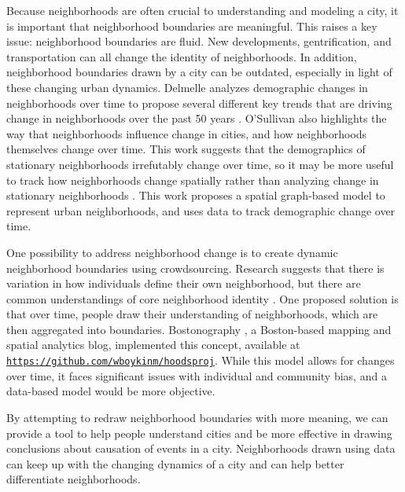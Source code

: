 \documentclass[times new roman,12pt]{article}
\begin{document}
Because neighborhoods are often crucial to understanding and modeling a city, it is important that neighborhood boundaries are meaningful. This raises a key issue: neighborhood boundaries are fluid. New developments, gentrification, and transportation can all change the identity of neighborhoods. In addition, neighborhood boundaries drawn by a city can be outdated, especially in light of these changing urban dynamics. Delmelle analyzes demographic changes in neighborhoods over time to propose several different key trends that are driving change in neighborhoods over the past 50 years \cite{delmelle2017differentiating}. O'Sullivan also highlights the way that neighborhoods influence change in cities, and how neighborhoods themselves change over time. This work suggests that the demographics of stationary neighborhoods irrefutably change over time, so it may be more useful to track how neighborhoods change spatially rather than analyzing change in stationary neighborhoods \cite{osullivan_neighborhoods_2009}. This work proposes a spatial graph-based model to represent urban neighborhoods, and uses data to track demographic change over time. 


One possibility to address neighborhood change is to create dynamic neighborhood boundaries using crowdsourcing. Research suggests that there is variation in how individuals define their own neighborhood, but there are common understandings of core neighborhood identity \cite{CoultonClaudia2011FPiC}. One proposed solution is that over time, people draw their understanding of neighborhoods, which are then aggregated into boundaries. Bostonography \cite{woodruff_crowdsourced_2012}, a Boston-based mapping and spatial analytics blog, implemented this concept, available at \href{https://github.com/wboykinm/hoodsproj}{\texttt{https://github.com/wboykinm/hoodsproj}}. While this model allows for changes over time, it faces significant issues with individual and community bias, and a data-based model would be more objective.

By attempting to redraw neighborhood boundaries with more meaning, we can provide a tool to help people understand cities and be more effective in drawing conclusions about causation of events in a city. Neighborhoods drawn using data can keep up with the changing dynamics of a city and can help better differentiate neighborhoods.
\end{document}
